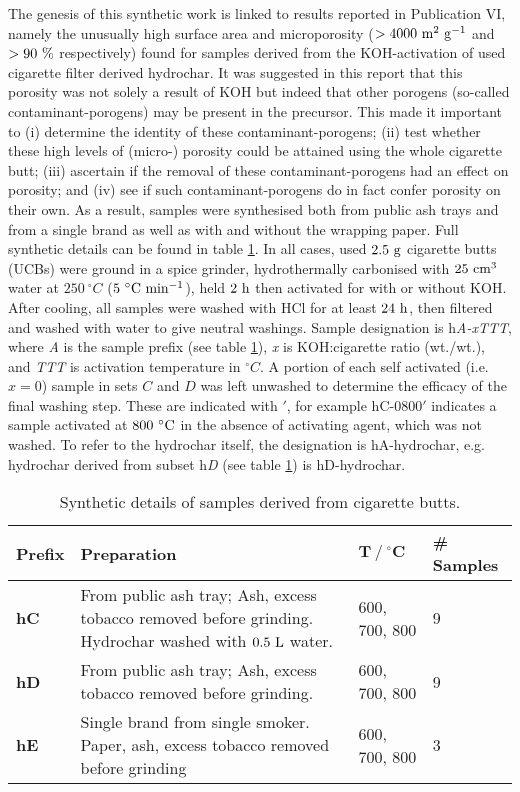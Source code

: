 The genesis of this synthetic work is linked to results reported in Publication VI, namely the unusually high surface area and microporosity ($ \rm > 4000\ m^2\ g^{-1}$ and $\rm > 90\ \%$ respectively) found for samples derived from the KOH-activation of used cigarette filter derived hydrochar. It was suggested in this report that this porosity was not solely a result of KOH but indeed that other porogens (so-called contaminant-porogens) may be present in the precursor. This made it important to (i) determine the identity of these  contaminant-porogens; (ii) test whether these high levels of (micro-) porosity could be attained using the whole cigarette butt; (iii) ascertain if the removal of these contaminant-porogens had an effect on porosity; and (iv) see if such contaminant-porogens do in fact confer porosity on their own. As a result, samples were synthesised both from public ash trays and from a single brand as well as with and without the wrapping paper. Full synthetic details can be found in table \ref{tb:cb_synthesis}. In all cases, used $\rm 2.5\ g$ cigarette butts (UCBs) were ground in a spice grinder, hydrothermally carbonised with $\rm 25\ cm^3$ water at $250\ ^{\circ}C$ ($\rm 5\ ^{\circ}C\ min^{-1}$), held $\rm 2\ h$ then activated for with or without KOH. After cooling, all samples were washed with HCl for at least $\rm 24\ h$, then filtered and washed with water to give neutral washings. Sample designation is h\textit{A-xTTT}, where \textit{A} is the sample prefix (see table \ref{tb:cb_synthesis}), \textit{x} is KOH:cigarette ratio (wt./wt.), and \textit{TTT} is activation temperature in $^{\circ}C$. A portion of each self activated (i.e. $x = 0$) sample in sets $C$ and $D$ was left unwashed to determine the efficacy of the final washing step. These are indicated with $'$, for example hC-0800$'$ indicates a sample activated at $\rm 800\ ^{\circ}C$ in the absence of activating agent, which was not washed. To refer to the hydrochar itself, the designation is hA-hydrochar, e.g. hydrochar derived from subset h\textit{D} (see table \ref{tb:cb_synthesis}) is hD-hydrochar.

\begin{table}[b]
\caption{Synthetic details of samples derived from cigarette butts.}
\label{tb:cb_synthesis}
\begin{tabularx}{\textwidth}{lXll}
\toprule
\textbf{Prefix} & \textbf{Preparation} & $\mathbf{T\ /\ ^{\circ}C}$ & \textbf{\# Samples} \\ 
\midrule
\textbf{hC}     & From public ash tray; Ash, excess tobacco removed before grinding. Hydrochar washed with $\rm 0.5\ L$ water.              & 600, 700, 800 & 9              \\
\textbf{hD}     &  From public ash tray; Ash, excess tobacco removed before grinding.             & 600, 700, 800 & 9             \\
\textbf{hE}     & Single brand from single smoker. Paper, ash, excess tobacco removed before grinding              & 600, 700, 800 & 3              \\
\bottomrule
\end{tabularx}%
\end{table}

